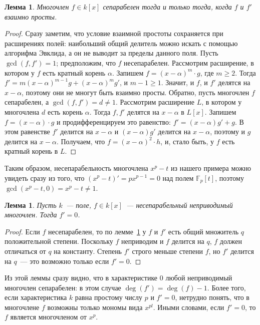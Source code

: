 \documentclass[a4paper,11pt]{scrartcl}
\theoremstyle{plain}
\newtheorem{lemma}[theorem]{Лемма}
\theoremstyle{definition}
\newcommand\mb{\mathbb}
\begin{document}
\begin{lemma}\label{derivative_rel_prime}
Многочлен $f\in k[x]$ сепарабелен тогда и только тогда, когда
$f$ и $f'$ взаимно просты.
\end{lemma}
\begin{proof}
Сразу заметим, что условие взаимной простоты сохраняется при
расширениях полей: наибольший общий делитель можно искать с помощью
алгорифма Эвклида, а он не выводит за пределы данного поля.
Пусть $\gcd(f,f')=1$; предположим, что $f$ несепарабелен. Рассмотрим
расширение, в котором у $f$ есть кратный корень $\alpha$. Запишем
$f=(x-\alpha)^m\cdot g$, где $m\geq 2$. Тогда
$f'=m(x-\alpha)^{m-1}g+(x-\alpha)^mg'$, и $m-1\geq 1$. Значит, и $f$,
и $f'$
делятся на $x-\alpha$, поэтому они не многут быть взаимно просты.
Обратно, пусть многочлен $f$ сепарабелен, а $\gcd(f,f')=d\neq
1$. Рассмотрим расширение $L$, в котором у многочлена $d$ есть корень
$\alpha$. Тогда $f,f'$ делятся на $x-\alpha$ в $L[x]$. Запишем $f=
(x-\alpha)\cdot
g$ и продифференцируем это равенство: $f'=(x-\alpha)g'+g$. В этом
равенстве $f'$ делится на $x-\alpha$ и $(x-\alpha)g'$ делится на
$x-\alpha$,
поэтому и $g$ делится на $x-\alpha$. Получаем, что $f=
(x-\alpha)^2\cdot h$, и,
стало быть, у $f$ есть кратный корень в $L$.
\end{proof}

Таким образом, несепарабельность многочлена $x^p-t$ из нашего примера
можно увидеть сразу из того, что $(x^p-t)'=px^{p-1}=0$ над полем $\mb
F_p[t]$, поэтому $\gcd(x^p-t,0)=x^p-t\neq 1$.

\begin{lemma}
Пусть $k$~--- поле, $f\in k[x]$~--- несепарабельный неприводимый
многочлен. Тогда $f'=0$.
\end{lemma}
\begin{proof}
Если $f$ несепарабелен, то по лемме~\ref{derivative_rel_prime} у $f$ и
$f'$ есть общий множитель $q$ положительной степени. Поскольку $f$
неприводим и $f$ делится на $q$, $f$ должен отличаться от $q$ на
константу. Степень $f'$ строго меньше степени $f$, но $f'$ делится на
$q$~--- это возможно только если $f'=0$.
\end{proof}

Из этой леммы сразу видно, что в характеристике 0 любой неприводимый
многочлен сепарабелен: в этом случае $\deg(f')=\deg(f)-1$. Более того,
если характеристика $k$ равна простому числу $p$ и $f'=0$, нетрудно
понять, что в многочлене $f$ возможны только мономы вида
$x^{pl}$. Иными словами, если $f'=0$, то $f$ является многочленом от
$x^p$.
\end{document}
